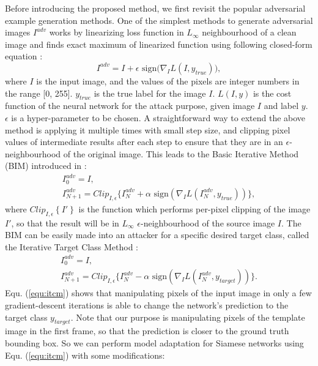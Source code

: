 Before introducing the proposed method, we first revisit the popular adversarial example generation methods. One of the simplest methods to generate adversarial images $I^{adv}$ works by linearizing loss function in $L_{\infty}$ neighbourhood of a clean image and finds exact maximum of linearized function using following closed-form equation \cite{FGSM}:
\begin{equation}
    I^{adv} = I + \epsilon \text{ sign} \bigl( \nabla_I L(I, y_{true})  \bigr),
\end{equation}
where $I$ is the input image, and the values of the pixels are integer numbers in the range [0, 255]. $y_{true}$ is the true label for the image $I$. $L(I, y)$ is the cost function of the neural network for the attack purpose, given image $I$ and label $y$. $\epsilon$ is a hyper-parameter to be chosen. A straightforward way to extend the above method is applying it multiple times with small step size, and clipping pixel values of intermediate results after each step to ensure that they are in an $\epsilon$-neighbourhood of the original image.  This leads to the Basic Iterative Method (BIM) introduced in \cite{kurakin2017adversarial}: 
\begin{equation}
    \begin{gathered}
        I_0^{adv} = I, \\
        I_{N+1}^{adv} = Clip_{I,\epsilon}\{I_N^{adv}+\alpha \text{ sign}(\nabla_I L(I_N^{adv},y_{true}))\},
    \end{gathered}
\end{equation}
where $Clip_{I, \epsilon} \left\{ I' \right\}$ is the function which performs per-pixel clipping of the image $I'$, so that the result will be in $L_{\infty}$ $\epsilon$-neighbourhood of the source image $I$.
The BIM can be easily made into an attacker for a specific desired target class, called the Iterative Target Class Method \cite{kurakin2017adversarial}:
\begin{equation}
    \begin{gathered}
        I_0^{adv} = I,\\
        I_{N+1}^{adv} = Clip_{I,\epsilon}\{I_N^{adv}-\alpha \text{ sign}(\nabla_I L(I_N^{adv},y_{target}))\}.
    \end{gathered}
    \label{equ:itcm}
\end{equation}
Equ. (\ref{equ:itcm}) shows that manipulating pixels of the input image in only a few gradient-descent iterations is able to change the network's prediction to the target class $y_{target}$. Note that our purpose is manipulating pixels of the template image in the first frame, so that the prediction is closer to the ground truth bounding box. So we can perform model adaptation for Siamese networks using Equ. (\ref{equ:itcm}) with some modifications:
